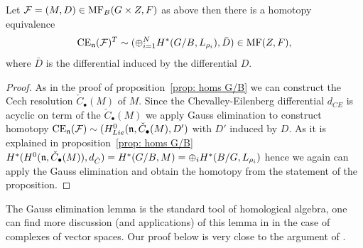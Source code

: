 \begin{proposition} Let $\mathcal{F}=(M,D)\in \mathrm{MF}_B(G\times Z,F)$ as above then there is a homotopy equivalence
$$ \mathrm{CE}_{\mathfrak{n}}(\mathcal{F})^T\sim (\oplus_{i=1}^N H^*(G/B, L_{\rho_i}), \bar{D})\in \mathrm{MF}(Z,F),$$
where $\bar{D}$ is the differential induced by the differential $D$.%
\end{proposition}
\begin{proof}
  As in the proof of proposition~\ref{prop: homs G/B} we can construct the Cech resolution \(\check{C}_\bullet(M)\) of \(M\). Since the Chevalley-Eilenberg differential \(d_{CE}\)
  is acyclic on term of the \(\check{C}_\bullet(M)\) we apply Gauss elimination to construct homotopy
  \(\mathrm{CE}_{\mathfrak{n}}(\mathcal{F})\sim (H^0_{Lie}(\mathfrak{n},\check{C}_\bullet(M),D')\) with \(D'\) induced by \(D\).
  As it is explained in proposition~\ref{prop: homs G/B} \(H^*(H^0(\mathfrak{n},\check{C}_\bullet(M)),d_{\check{C}})=H^*(G/B,M)=\oplus_i H^*(B/G,L_{\rho_i})\)
  hence we again can apply the Gauss elimination and obtain the homotopy from the statement of the proposition.
  \end{proof}

  The Gauss elimination lemma is the standard tool of homological algebra, one can find more discussion (and applications) of this lemma in \cite{BN} in the case of complexes
  of vector spaces. Our proof below is very close to the argument of \cite{BN}.

